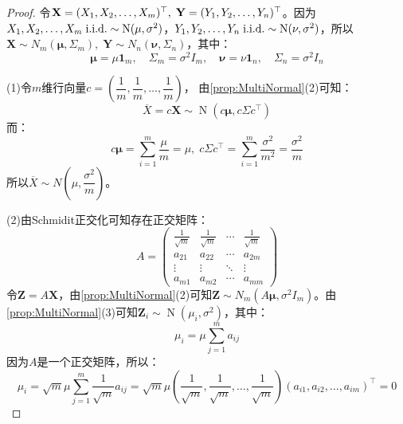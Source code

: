 \begin{proof}
	令$\mathbf{X}=(X_1, X_2, \dots, X_{m})^{\top},\;\mathbf{Y}=(Y_1, Y_2, \dots, Y_{n})^{\top}$。因为$X_1, X_2, \dots, X_{m}\;\text{i.i.d.}\sim \operatorname{N}(\mu,\sigma^2)$，$Y_1, Y_2, \dots, Y_{n}\;\text{i.i.d.}\sim \operatorname{N}(\nu,\sigma^2)$，所以$\mathbf{X}\sim N_m(\boldsymbol{\mu},\Sigma_m),\;\mathbf{Y}\sim N_n(\boldsymbol{\nu},\Sigma_n)$，其中：
	\begin{equation*}
		\boldsymbol{\mu}=\mu\mathbf{1}_m,\quad\Sigma_m=\sigma^2I_m,\quad\boldsymbol{\nu}=\nu\mathbf{1}_n,\quad\Sigma_n=\sigma^2I_n
	\end{equation*}\par
	(1)令$m$维行向量$c=\left(\dfrac{1}{m},\dfrac{1}{m},\dots,\dfrac{1}{m}\right)$，
	由\cref{prop:MultiNormal}(2)可知：
	\begin{equation*}
		\overline{X}=c\mathbf{X}\sim \operatorname{N}(c\boldsymbol{\mu},c\Sigma c^{\top})
	\end{equation*}
	而：
	\begin{equation*}
		c\boldsymbol{\mu}=\sum_{i=1}^{m}\frac{\mu}{m}=\mu,\;c\Sigma c^{\top}=\sum_{i=1}^{m}\frac{\sigma^2}{m^2}=\frac{\sigma^2}{m}
	\end{equation*}
	所以$\overline{X}\sim N\left(\mu,\dfrac{\sigma^2}{m}\right)$。\par
	(2)由Schmidit正交化可知存在正交矩阵：
	\begin{equation*}
		A=
		\begin{pmatrix}
			\frac{1}{\sqrt{m}} & \frac{1}{\sqrt{m}} & \cdots & \frac{1}{\sqrt{m}} \\
			a_{21} & a_{22} & \cdots & a_{2m} \\
			\vdots & \vdots & \ddots & \vdots \\
			a_{m1} & a_{m2} & \cdots & a_{mm}
		\end{pmatrix}
	\end{equation*}
	令$\mathbf{Z}=A\mathbf{X}$，由\cref{prop:MultiNormal}(2)可知$\mathbf{Z}\sim N_m(A\boldsymbol{\mu},\sigma^2I_m)$。由\cref{prop:MultiNormal}(3)可知$\mathbf{Z}_i\sim \operatorname{N}(\mu_i,\sigma^2)$，其中：
	\begin{equation*}
		\mu_i=\mu\sum_{j=1}^{m}a_{ij}
	\end{equation*}
	因为$A$是一个正交矩阵，所以：
	\begin{equation*}
		\mu_i=\sqrt{m}\mu\sum_{j=1}^{m}\frac{1}{\sqrt{m}}a_{ij}=\sqrt{m}\mu\left(\dfrac{1}{\sqrt{m}},\dfrac{1}{\sqrt{m}},\dots,\dfrac{1}{\sqrt{m}}\right)(a_{i1},a_{i2},\dots,a_{im})^{\top}=0
	\end{equation*}

\end{proof}
